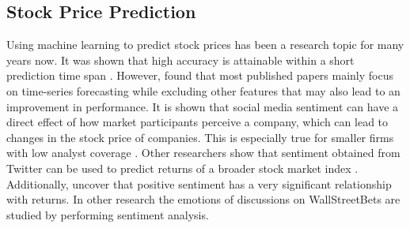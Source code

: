 \documentclass[11pt, a4paper]{article}
\begin{document}
\subsection{Stock Price Prediction}

Using machine learning to predict stock prices has been a research topic for many years now. It was shown that high accuracy is attainable within
a short prediction time span \citep{schoneburg1990prediction}. However, \cite{gooijer2006forecasting} found that most published papers mainly focus on time-series forecasting while excluding other features
that may also lead to an improvement in performance.
It is shown that social media sentiment can have a 
direct effect of how market participants perceive a company, which can lead to changes in the stock price of companies. This is especially true for smaller 
firms with low analyst coverage \citep{feng2019824}. Other researchers show that sentiment obtained from Twitter can be used to predict returns of a 
broader stock market index \citep{gu2020twtrsentiment}.
Additionally, \cite{werner2004talknoise} uncover that positive sentiment has a very significant relationship with returns.
In other research the emotions of discussions on WallStreetBets are studied by performing sentiment analysis. 
\end{document}
